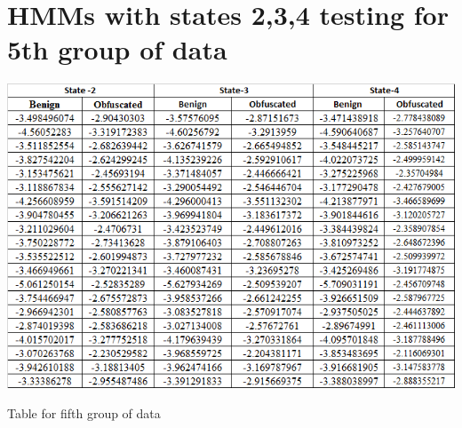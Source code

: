 \section{HMMs with states 2,3,4 testing for 5th group of data}
\begin{table}
\centering
\includegraphics[width=1.0\textwidth]{images/a5.png}
\caption{Table for fifth group of data} 
\label{table:Table for fifth group of data}
\end{table}
\pagebreak